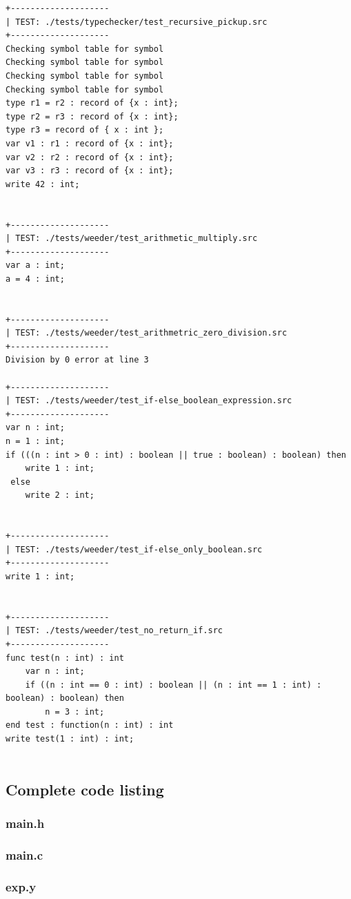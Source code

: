 \documentclass[a4paper,10pt,titlepage]{report}
\begin{document}
\begin{lstlisting}
+--------------------
| TEST: ./tests/typechecker/test_recursive_pickup.src
+--------------------
Checking symbol table for symbol
Checking symbol table for symbol
Checking symbol table for symbol
Checking symbol table for symbol
type r1 = r2 : record of {x : int};
type r2 = r3 : record of {x : int};
type r3 = record of { x : int };
var v1 : r1 : record of {x : int};
var v2 : r2 : record of {x : int};
var v3 : r3 : record of {x : int};
write 42 : int;

 
+--------------------
| TEST: ./tests/weeder/test_arithmetic_multiply.src
+--------------------
var a : int;
a = 4 : int;

 
+--------------------
| TEST: ./tests/weeder/test_arithmetric_zero_division.src
+--------------------
Division by 0 error at line 3
 
+--------------------
| TEST: ./tests/weeder/test_if-else_boolean_expression.src
+--------------------
var n : int;
n = 1 : int;
if (((n : int > 0 : int) : boolean || true : boolean) : boolean) then
    write 1 : int;
 else
    write 2 : int;

 
+--------------------
| TEST: ./tests/weeder/test_if-else_only_boolean.src
+--------------------
write 1 : int;

 
+--------------------
| TEST: ./tests/weeder/test_no_return_if.src
+--------------------
func test(n : int) : int
    var n : int;
    if ((n : int == 0 : int) : boolean || (n : int == 1 : int) : boolean) : boolean) then
        n = 3 : int;
end test : function(n : int) : int
write test(1 : int) : int;


\end{lstlisting}

\subsection{Complete code listing}

\subsubsection{main.h}


\subsubsection{main.c}




\subsubsection{exp.y}

\end{document}
